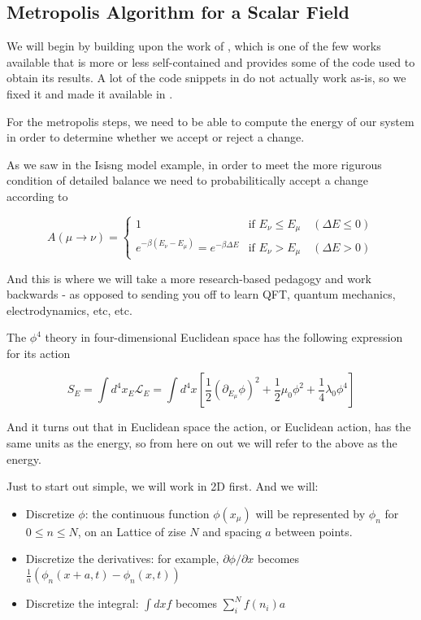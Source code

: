 
\subsection{Metropolis Algorithm for a Scalar Field}

We will begin by building upon the work of \cite{david-lattice-qft}, which is one of the few works available that is more or
less self-contained and provides some of the code used to obtain its results.
A lot of the code snippets in \cite{david-lattice-qft} do not actually work as-is, so we fixed it and made it
available in \cite{our-phi-4}.

For the metropolis steps, we need to be able to compute the energy of our system in order to determine whether we
accept or reject a change.

As we saw in the Isisng model example, in order to meet the more rigurous condition of detailed balance we need to
probabilitically accept a change according to

$$
A(\mu \rightarrow \nu)
=
\begin{cases}
1           & \text{if } E_\nu \leq E_\mu \quad(\Delta E \leq 0) \\
e^{-\beta (E_\nu - E_\mu)} = e^{-\beta \Delta E}   & \text{if } E_\nu > E_\mu \quad(\Delta E > 0)
\end{cases}
$$

And this is where we will take a more research-based pedagogy and work backwards - as opposed to sending you off
to learn QFT, quantum mechanics, electrodynamics, etc, etc.

The $\phi^4$ theory in four-dimensional Euclidean space has the following expression for its action

$$
S_{E} = 
\int d^4 x_E \mathcal{L}_{E} =
\int d^4 x \left[ 
    \frac{1}{2} \left( \partial_{E_\mu} \phi \right)^2 + \frac{1}{2} \mu_0 \phi^2 + \frac{1}{4} \lambda_0 \phi^4
\right]
$$

And it turns out that in Euclidean space the action, or Euclidean action, has the same units as the energy,
so from here on out we will refer to the above as the energy.

Just to start out simple, we will work in 2D first.
And we will:

\begin{itemize}
\item Discretize $\phi$: the continuous function $\phi(x_\mu)$ will be represented by $\phi_n$ for $0 \leq n \leq N$,
    on an Lattice of zise $N$ and spacing $a$ between points.
\item Discretize the derivatives: for example, $\partial \phi / \partial x$ becomes
    $\frac{1}{a} \left( \phi_n(x+a,t) - \phi_n(x,t) \right)$
\item Discretize the integral: $\int dx f$ becomes $\sum^{N}_{i} f(n_i) a$
\end{itemize}

